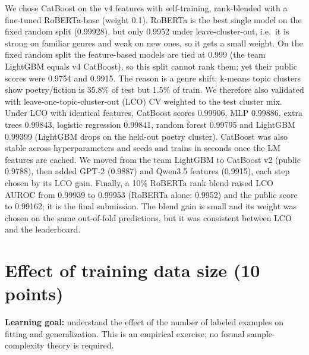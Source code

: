 \documentclass[11pt,letterpaper]{article}
\begin{document}
We chose CatBoost on the v4 features with self-training, rank-blended with a fine-tuned RoBERTa-base (weight 0.1). RoBERTa is the best single model on the fixed random split (0.99928), but only 0.9952 under leave-cluster-out, i.e.\ it is strong on familiar genres and weak on new ones, so it gets a small weight. On the fixed random split the feature-based models are tied at 0.999 (the team LightGBM equals v4 CatBoost), so this split cannot rank them; yet their public scores were 0.9754 and 0.9915. The reason is a genre shift: k-means topic clusters show poetry/fiction is 35.8\% of test but 1.5\% of train. We therefore also validated with leave-one-topic-cluster-out (LCO) CV weighted to the test cluster mix. Under LCO with identical features, CatBoost scores 0.99906, MLP 0.99886, extra trees 0.99843, logistic regression 0.99841, random forest 0.99795 and LightGBM 0.99399 (LightGBM drops on the held-out poetry cluster). CatBoost was also stable across hyperparameters and seeds and trains in seconds once the LM features are cached. We moved from the team LightGBM to CatBoost v2 (public 0.9788), then added GPT-2 (0.9887) and Qwen3.5 features (0.9915), each step chosen by its LCO gain. Finally, a 10\% RoBERTa rank blend raised LCO AUROC from 0.99939 to 0.99953 (RoBERTa alone: 0.9952) and the public score to 0.99162; it is the final submission. The blend gain is small and its weight was chosen on the same out-of-fold predictions, but it was consistent between LCO and the leaderboard.

\section{Effect of training data size (10 points)}
\textbf{Learning goal:} understand the effect of the number of labeled examples on fitting and generalization. This is an empirical exercise; no formal sample-complexity theory is required.
\end{document}

